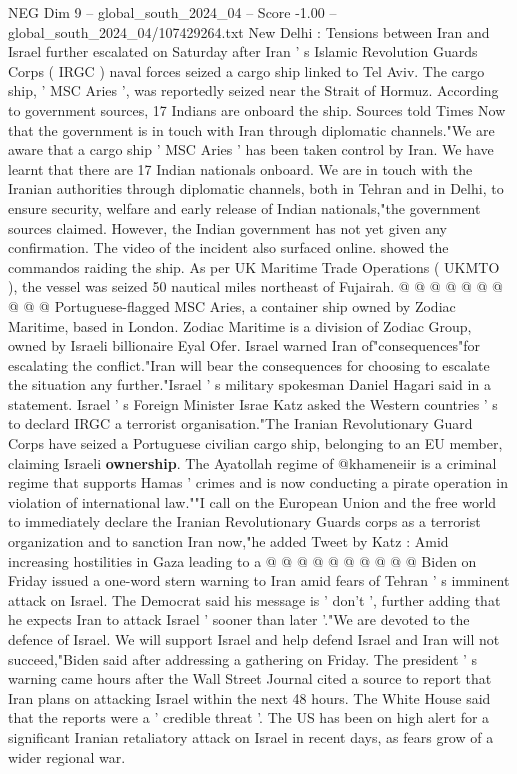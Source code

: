 \begin{textsample}{NEG Dim 9 – global\_south\_2024\_04 – Score -1.00 – global\_south\_2024\_04/107429264.txt}  \label{ex:f9_neg_383}
New Delhi : Tensions between Iran and Israel further escalated on Saturday after Iran ' s Islamic Revolution Guards Corps ( IRGC ) naval forces seized a cargo ship linked to Tel Aviv.
The cargo ship, ' MSC Aries ', was reportedly seized near the Strait of Hormuz.
According to government sources, 17 Indians are onboard the ship.
Sources told Times Now that the government is in touch with Iran through diplomatic channels."We are aware that a cargo ship ' MSC Aries ' has been taken control by Iran.
We have learnt that there are 17 Indian nationals onboard.
We are in touch with the Iranian authorities through diplomatic channels, both in Tehran and in Delhi, to ensure security, welfare and early release of Indian nationals,"the government sources claimed.
However, the Indian government has not yet given any confirmation.
The video of the incident also surfaced online. showed the commandos raiding the ship.
As per UK Maritime Trade Operations ( UKMTO ), the vessel was seized 50 nautical miles northeast of Fujairah. @ @ @ @ @ @ @ @ @ @ Portuguese-flagged MSC Aries, a container ship owned by Zodiac Maritime, based in London.
Zodiac Maritime is a division of Zodiac Group, owned by Israeli billionaire Eyal Ofer.
Israel warned Iran of"consequences"for escalating the conflict."Iran will bear the consequences for choosing to escalate the situation any further."Israel ' s military spokesman Daniel Hagari said in a statement.
Israel ' s Foreign Minister Israe Katz asked the Western countries ' s to declard IRGC a terrorist organisation."The Iranian Revolutionary Guard Corps have seized a Portuguese civilian cargo ship, belonging to an EU member, claiming Israeli \textbf{ownership}.
The Ayatollah regime of @khameneiir is a criminal regime that supports Hamas ' crimes and is now conducting a pirate operation in violation of international law.""I call on the European Union and the free world to immediately declare the Iranian Revolutionary Guards corps as a terrorist organization and to sanction Iran now,"he added Tweet by Katz : Amid increasing hostilities in Gaza leading to a @ @ @ @ @ @ @ @ @ @ Biden on Friday issued a one-word stern warning to Iran amid fears of Tehran ' s imminent attack on Israel.
The Democrat said his message is ' don't ', further adding that he expects Iran to attack Israel ' sooner than later '."We are devoted to the defence of Israel.
We will support Israel and help defend Israel and Iran will not succeed,"Biden said after addressing a gathering on Friday.
The president ' s warning came hours after the Wall Street Journal cited a source to report that Iran plans on attacking Israel within the next 48 hours.
The White House said that the reports were a ' credible threat '.
The US has been on high alert for a significant Iranian retaliatory attack on Israel in recent days, as fears grow of a wider regional war.

\end{textsample}
